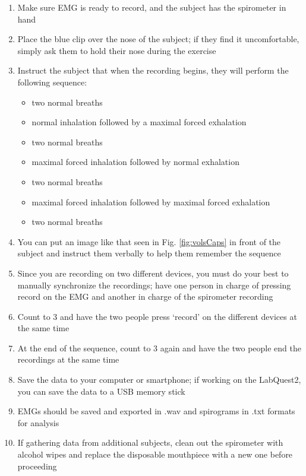 \documentclass[12pt]{article}
\begin{document}
\begin{enumerate}
\item Make sure EMG is ready to record, and the subject has the spirometer in hand
\item Place the blue clip over the nose of the subject; if they find it uncomfortable, simply ask them to hold their nose during the exercise
\item Instruct the subject that when the recording begins, they will perform the following sequence:
	\begin{itemize}
	\item two normal breaths
    \item normal inhalation followed by a maximal forced exhalation
    \item two normal breaths
    \item maximal forced inhalation followed by normal exhalation
    \item two normal breaths
    \item maximal forced inhalation followed by maximal forced exhalation
    \item two normal breaths
	\end{itemize}
\item You can put an image like that seen in Fig. \ref{fig:volsCaps} in front of the subject and instruct them verbally to help them remember the sequence
\item Since you are recording on two different devices, you must do your best to manually synchronize the recordings; have one person in charge of pressing record on the EMG and another in charge of the spirometer recording
\item Count to 3 and have the two people press `record' on the different devices at the same time
\item At the end of the sequence, count to 3 again and have the two people end the recordings at the same time
\item Save the data to your computer or smartphone; if working on the LabQuest2, you can save the data to a USB memory stick 
\item EMGs should be saved and exported in .wav and spirograms in .txt formats for analysis
\item If gathering data from additional subjects, clean out the spirometer with alcohol wipes and replace the disposable mouthpiece with a new one before proceeding
\end{enumerate}

\end{document}
